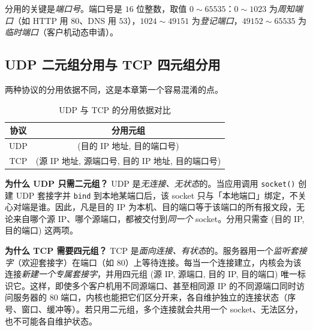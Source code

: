 分用的关键是\emph{端口号}。端口号是 $16$ 位整数，取值 $0\sim65535$：$0\sim1023$ 为\emph{周知端口}（如 HTTP 用 $80$、DNS 用 $53$），$1024\sim49151$ 为\emph{登记端口}，$49152\sim65535$ 为\emph{临时端口}（客户机动态申请）。

\subsection{UDP 二元组分用与 TCP 四元组分用}

两种协议的分用依据不同，这是本章第一个容易混淆的点。

\begin{table}[H]
\centering
\caption{UDP 与 TCP 的分用依据对比}
\begin{tabulary}{\textwidth}{CC}
\toprule
协议 & 分用元组 \\
\midrule
UDP & (目的 IP 地址, 目的端口号) \\
TCP & (源 IP 地址, 源端口号, 目的 IP 地址, 目的端口号) \\
\bottomrule
\end{tabulary}
\label{tab:demux}
\end{table}

\textbf{为什么 UDP 只需二元组？} UDP 是\emph{无连接、无状态}的。当应用调用 \texttt{socket()} 创建 UDP 套接字并 \texttt{bind} 到本地某端口后，该 socket 只与「本地端口」绑定，不关心对端是谁。因此，凡是目的 IP 为本机、目的端口等于该端口的所有报文段，无论来自哪个源 IP、哪个源端口，都被交付到\emph{同一个} socket。分用只需查 (目的 IP, 目的端口) 这两项。

\textbf{为什么 TCP 需要四元组？} TCP 是\emph{面向连接、有状态}的。服务器用一个\emph{监听套接字}（欢迎套接字）在端口（如 $80$）上等待连接。每当一个连接建立，内核会为该连接\emph{新建一个专属套接字}，并用四元组 (源 IP, 源端口, 目的 IP, 目的端口) 唯一标识它。这样，即使多个客户机用不同源端口、甚至相同源 IP 的不同源端口同时访问服务器的 $80$ 端口，内核也能把它们区分开来，各自维护独立的连接状态（序号、窗口、缓冲等）。若只用二元组，多个连接就会共用一个 socket、无法区分，也不可能各自维护状态。

